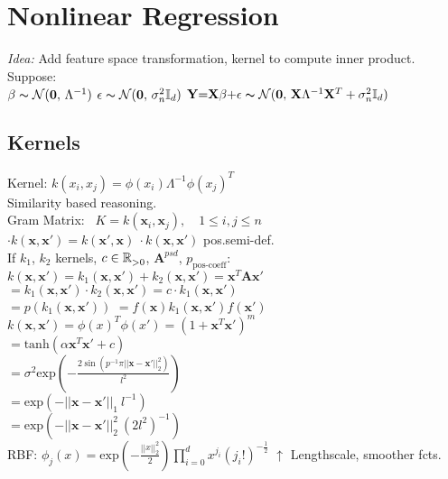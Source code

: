 \section*{Nonlinear Regression}
\textit{Idea:} Add feature space transformation, kernel to compute inner product. Suppose:\\
$\beta \thicksim \mathcal{N}(\mathbf{0},\,\Lambda^{-1})$ $\epsilon \thicksim \mathcal{N}(\mathbf{0},\,\sigma_n^2\mathbb{I}_{d})$
$\mathbf{Y} {=} \mathbf{X} \mathbb{\beta} {+} \mathbb{\epsilon} \thicksim \mathcal{N}(\mathbf{0},\,\mathbf{X} \Lambda^{-1}\mathbf{X}^T + \sigma_n^2\mathbb{I}_{d})$

\subsection*{Kernels}
Kernel: $k(x_i, x_j) = \phi(x_i)\Lambda^{-1} \phi(x_j)^T$ \\
Similarity based reasoning.\\
Gram Matrix: \  $K = k(\mathbf{x}_i, \mathbf{x}_j), \quad 1{\leq} i,j{\leq} n$\\
$\cdot k(\mathbf{x},\mathbf{x'}){=}k(\mathbf{x'},\mathbf{x}) \  \cdot k(\mathbf{x},\mathbf{x'})$ pos.semi-def. \\
If $k_1$, $k_2$ kernels, $c\in\mathbb{R}^{}_{>0}$, $\mathbf{A}^{psd}$, $p_{\text{pos-coeff}}$:\\
$k(\mathbf{x}, \mathbf{x'}) = k_1(\mathbf{x}, \mathbf{x'}) {+} k_2(\mathbf{x}, \mathbf{x'})=\mathbf{x}^T \mathbf{A} \mathbf{x'}$
$ = k_1(\mathbf{x}, \mathbf{x'}) {\cdot} k_2(\mathbf{x}, \mathbf{x'}) = c {\cdot} k_1(\mathbf{x}, \mathbf{x'})$\\
${=}p(k_1(\mathbf{x}, \mathbf{x'}))$
${=}f(\mathbf{x}) k_1(\mathbf{x}, \mathbf{x'}) f(\mathbf{x'})$\\

$k(\mathbf{x}, \mathbf{x'}) = \phi(x)^T\phi(x') = (1 + \mathbf{x}^T\mathbf{x'})^m$\\
$ = \mathrm{tanh}(\alpha\mathbf{x}^T\mathbf{x'}+c)$\\
$ = \sigma^2\mathrm{exp}(-\frac{2\sin{(p^{-1} \pi ||\mathbf{x}{-}\mathbf{x'}||_2^2)}}{l^2})$\\
$ = \mathrm{exp}(-||\mathbf{x}{-}\mathbf{x'}||_1 \ l^{-1})$\\
$ = \mathrm{exp}(-||\mathbf{x}{-}\mathbf{x'}||_2^2 \ (2l^2)^{-1})$\\
RBF: $\phi_j(x){=}\mathrm{exp}(-\frac{||x||_2^2}{2})\prod_{i=0}^{d}x^{j_i}({j_i}!)^{-\frac{1}{2}}$
$\uparrow$ Lengthscale, smoother fcts.

